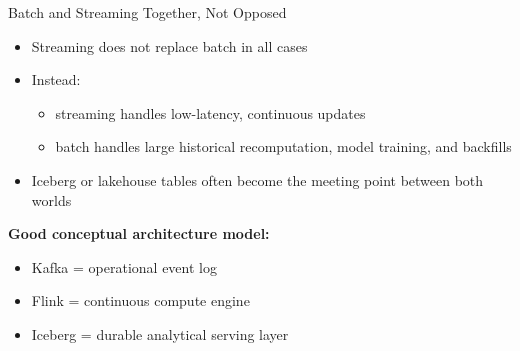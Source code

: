 \documentclass[aspectratio=169]{beamer}
\begin{document}
\begin{frame}{Batch and Streaming Together, Not Opposed}
\begin{itemize}
    \item Streaming does not replace batch in all cases
    \item Instead:
    \begin{itemize}
        \item streaming handles low-latency, continuous updates
        \item batch handles large historical recomputation, model training, and backfills
    \end{itemize}
    \item Iceberg or lakehouse tables often become the meeting point between both worlds
\end{itemize}

\vspace{0.3cm}
\textbf{Good conceptual architecture model:}
\begin{itemize}
    \item Kafka = operational event log
    \item Flink = continuous compute engine
    \item Iceberg = durable analytical serving layer
\end{itemize}
\end{frame}
\end{document}
